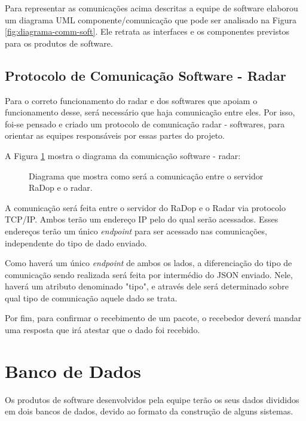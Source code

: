 Para representar as comunicações acima descritas a equipe de software elaborou um diagrama UML componente/comunicação que pode ser analisado na Figura \ref{fig:diagrama-comm-soft}. Ele retrata as interfaces e os componentes previstos para os produtos de software.

\subsection{Protocolo de Comunicação Software - Radar}

Para o correto funcionamento do radar e dos softwares que apoiam o funcionamento desse, será necessário que haja comunicação entre eles. Por isso, foi-se pensado e criado um protocolo de comunicação radar - softwares, para orientar as equipes responsáveis por essas partes do projeto.

A Figura \ref{fig:diagrama-com-soft-radar} mostra o diagrama da comunicação software - radar:

\begin{figure}[ht]
	\caption{\label{fig:diagrama-com-soft-radar} Diagrama que mostra como será a comunicação entre o servidor RaDop e o radar.}
\end{figure}

A comunicação será feita entre o servidor do RaDop e o Radar via protocolo TCP/IP. Ambos terão um endereço IP pelo do qual serão acessados. Esses endereços terão um único \textit{endpoint} para ser acessado nas comunicações, independente do tipo de dado enviado.

Como haverá um único \textit{endpoint} de ambos os lados, a diferenciação do tipo de comunicação sendo realizada será feita por intermédio do JSON enviado. Nele, haverá um atributo denominado "tipo", e através dele será determinado sobre qual tipo de comunicação aquele dado se trata.

Por fim, para confirmar o recebimento de um pacote, o recebedor deverá mandar uma resposta que irá atestar que o dado foi recebido.

\section{Banco de Dados}

Os produtos de software desenvolvidos pela equipe terão os seus dados divididos em dois bancos de dados, devido ao formato da construção de alguns sistemas.

